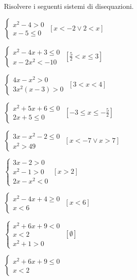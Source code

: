 \begin{esercizio}[\Ast]
 \label{ese:4.75}
Risolvere i seguenti sistemi di disequazioni.
\begin{multicols}{2}
\begin{enumeratea}
\item $\left\{\begin{array}{l}x^2-4>0\\x-5\le 0\end{array}\right.$ 
 \hfill $\left[x<-2\vee 2<x\right]$
\item $\left\{\begin{array}{l}x^2-4x+3\le 0\\x-2x^2<-10\end{array}\right.$
 \hfill $\left[\frac 5 2<x\le 3\right]$
\item $\left\{\begin{array}{l}4x-x^2>0\\3x^2(x-3)>0\end{array}\right.$
 \hfill $\left[3<x<4\right]$
\item $\left\{\begin{array}{l}x^2+5x+6\le 0\\2x+5\le 0\end{array}\right.$
 \hfill $\left[-3\le x\le -\frac 5 2\right]$
\item $\left\{\begin{array}{l}3x-x^2-2\le 0\\x^2>49\end{array}\right.$
 \hfill $\left[x<-7\vee x>7\right]$
\item $\left\{\begin{array}{l}3x-2>0\\x^2-1>0\\2x-x^2<0\end{array}\right.$
 \hfill $\left[x>2\right]$
\item $\left\{\begin{array}{l}x^2-4x+4\ge 0\\x<6\end{array}\right.$
 \hfill $\left[x<6\right]$
\item $\left\{\begin{array}{l}x^2+6x+9<0\\x<2\\x^2+1>0\end{array}\right.$
 \hfill $\left[\emptyset\right]$
\item $\left\{\begin{array}{l}x^2+6x+9\le 0\\x<2\end{array}\right.$

\end{enumeratea}
\end{multicols}
\end{esercizio}
